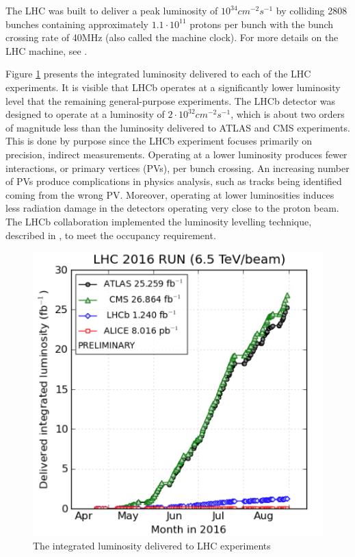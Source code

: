 The LHC was built to deliver a peak luminosity of $10^{34} cm^{-2}s^{-1}$ by colliding 2808 bunches containing approximately $1.1 \cdot 10^{11}$ protons per bunch with the bunch crossing rate of 40MHz (also called the machine clock).  For more details on the LHC machine, see \cite{LHC_machine}.

Figure \ref{fig:Luminosity} presents the integrated luminosity delivered to each of the LHC experiments. It is visible that LHCb operates at a significantly lower luminosity level that the remaining general-purpose experiments.  The LHCb detector was designed to operate at a luminosity of $2 \cdot 10^{32}cm^{-2}s^{-1}$, which is about two orders of magnitude less than the luminosity delivered to ATLAS and CMS experiments. This is done by purpose since the LHCb experiment focuses primarily on precision, indirect measurements. Operating at a lower luminosity produces fewer interactions, or primary vertices (PVs), per bunch crossing. An increasing number of PVs produce complications in physics analysis, such as tracks being identified coming from the wrong PV.  Moreover, operating at lower luminosities induces less radiation damage in the detectors operating very close to the proton beam. The LHCb collaboration implemented the luminosity levelling technique, described in \cite{lumi_down}, to meet the occupancy requirement. 

\begin{figure}
\centering
\includegraphics[scale=0.5]{figures/Luminosity.png}
\caption[Luminosity]{The integrated luminosity delivered to LHC experiments
\label{fig:Luminosity}}
\end{figure}


